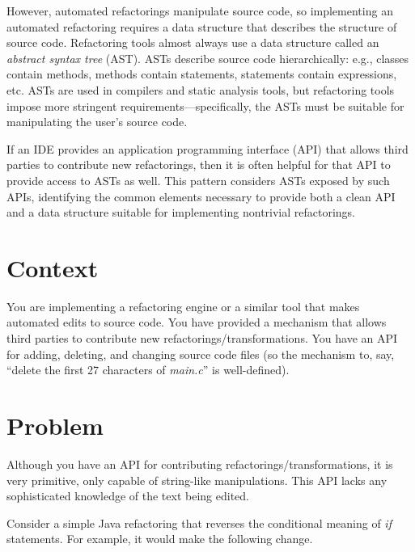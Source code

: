 \documentclass[prodmode]{acmlarge}
\begin{document}
However, automated refactorings manipulate source code, so implementing an
automated refactoring requires a data structure that describes the structure of
source code.  Refactoring tools almost always use a data structure called an
\textit{abstract syntax tree} (AST).  ASTs describe source code hierarchically:
e.g., classes contain methods, methods contain statements, statements contain
expressions, etc.  ASTs are used in compilers and static analysis tools, but
refactoring tools impose more stringent requirements---specifically, the ASTs
must be suitable for manipulating the user's source code.

If an IDE provides an application programming interface (API) that allows third
parties to contribute new refactorings, then it is often helpful for that API
to provide access to ASTs as well.  This pattern considers ASTs exposed by such
APIs, identifying the common elements necessary to provide both a clean API and
a data structure suitable for implementing nontrivial refactorings.

\section{Context}

You are implementing a refactoring engine or a similar tool that makes
automated edits to source code.  You have provided a mechanism that allows
third parties to contribute new refactorings/transformations.  You have an API
for adding, deleting, and changing source code files (so the mechanism to, say,
``delete the first 27 characters of \textit{main.c}'' is well-defined).

\section{Problem}
\label{sec:Problem}

Although you have an API for contributing refactorings/transformations, it is 
very primitive, only capable of string-like manipulations. This API lacks any
sophisticated knowledge of the text being edited.

Consider a simple Java refactoring that reverses the conditional meaning of
\textit{if} statements. For example, it would make the following change.
\end{document}
